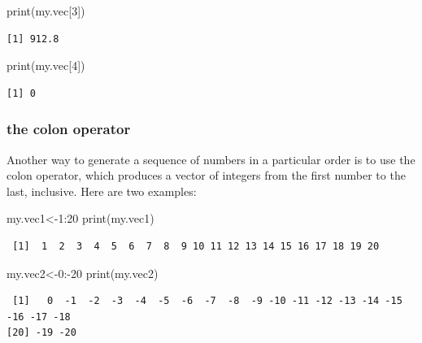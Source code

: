 \documentclass[
  letterpaper,
  DIV=11,
  numbers=noendperiod]{scrreprt}
\newenvironment{Shaded}{\begin{snugshade}}{\end{snugshade}}
\newcommand{\DecValTok}[1]{\textcolor[rgb]{0.68,0.00,0.00}{#1}}
\newcommand{\FunctionTok}[1]{\textcolor[rgb]{0.28,0.35,0.67}{#1}}
\newcommand{\NormalTok}[1]{\textcolor[rgb]{0.00,0.23,0.31}{#1}}
\newcommand{\OtherTok}[1]{\textcolor[rgb]{0.00,0.23,0.31}{#1}}
\newcommand{\SpecialCharTok}[1]{\textcolor[rgb]{0.37,0.37,0.37}{#1}}
\begin{document}
\begin{Shaded}
\begin{Highlighting}[]
\FunctionTok{print}\NormalTok{(my.vec[}\DecValTok{3}\NormalTok{])}
\end{Highlighting}
\end{Shaded}

\begin{verbatim}
[1] 912.8
\end{verbatim}

\begin{Shaded}
\begin{Highlighting}[]
\FunctionTok{print}\NormalTok{(my.vec[}\DecValTok{4}\NormalTok{])}
\end{Highlighting}
\end{Shaded}

\begin{verbatim}
[1] 0
\end{verbatim}

\hypertarget{the-colon-operator}{%
\subsubsection{the colon operator}\label{the-colon-operator}}

Another way to generate a sequence of numbers in a particular order is
to use the colon operator, which produces a vector of integers from the
first number to the last, inclusive. Here are two examples:

\begin{Shaded}
\begin{Highlighting}[]
\NormalTok{my.vec1}\OtherTok{\textless{}{-}}\DecValTok{1}\SpecialCharTok{:}\DecValTok{20}
\FunctionTok{print}\NormalTok{(my.vec1)}
\end{Highlighting}
\end{Shaded}

\begin{verbatim}
 [1]  1  2  3  4  5  6  7  8  9 10 11 12 13 14 15 16 17 18 19 20
\end{verbatim}

\begin{Shaded}
\begin{Highlighting}[]
\NormalTok{my.vec2}\OtherTok{\textless{}{-}}\DecValTok{0}\SpecialCharTok{:{-}}\DecValTok{20}
\FunctionTok{print}\NormalTok{(my.vec2)}
\end{Highlighting}
\end{Shaded}

\begin{verbatim}
 [1]   0  -1  -2  -3  -4  -5  -6  -7  -8  -9 -10 -11 -12 -13 -14 -15 -16 -17 -18
[20] -19 -20
\end{verbatim}
\end{document}
